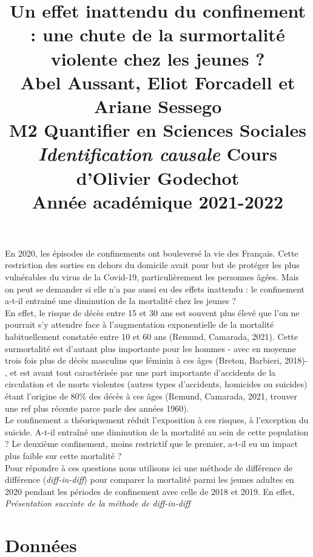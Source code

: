 \documentclass{article}
\title{\centering 

\vspace{1 cm}

{\begin{minipage}\linewidth
        \centering
     \textbf{ Un effet inattendu du confinement : une chute de la surmortalité violente chez les jeunes ?} \\[1 cm] 
        \vspace{0.5cm}
        \large Abel Aussant, Eliot Forcadell et Ariane Sessego\\
         M2 Quantifier en Sciences Sociales\\
        \vspace{0.5cm}
         \textit{Identification causale} Cours d'Olivier Godechot \\
         Année académique 2021-2022\\
    \end{minipage}}
  }
\date{}
\begin{document}

\maketitle

\cleardoublepage%

En 2020, les épisodes de confinements ont bouleversé la vie des Français. Cette restriction des sorties en dehors du domicile avait pour but de protéger les plus vulnérables du virus de la Covid-19, particulièrement les personnes âgées. Mais on peut se demander si elle n'a pas aussi eu des effets inattendu : le confinement a-t-il entrainé une diminution de la mortalité chez les jeunes ? \\

En effet, le risque de décès entre 15 et 30 ans est souvent plus élevé que l'on ne pourrait s'y attendre face à l'augmentation exponentielle de la mortalité habituellement constatée entre 10 et 60 ans (Remund, Camarada, 2021). Cette surmortalité est d'autant plus importante pour les hommes - avec en moyenne trois fois plus de décès masculins que féminin à ces âges (Breton, Barbieri, 2018)- , et est avant tout caractérisée par une part importante d'accidents de la circulation et de morts violentes (autres types d'accidents, homicides ou suicides) étant l'origine de 80\% des décès à ces âges (Remund, Camarada, 2021, trouver une ref plus récente parce parle des années 1960). \\

Le confinement a théoriquement réduit l'exposition à ces risques, à l'exception du suicide. A-t-il entraîné une diminution de la mortalité au sein de cette population ? Le deuxième confinement, moins restrictif que le premier, a-t-il eu un impact plus faible sur cette mortalité ? \\

Pour répondre à ces questions nous utilisons ici une méthode de différence de différence (\textit{diff-in-diff}) pour comparer la mortalité parmi les jeunes adultes en 2020 pendant les périodes de confinement avec celle de 2018 et 2019. En effet, \textit{Présentation succinte de la méthode de diff-in-diff} %



\section{Données}
\end{document}
